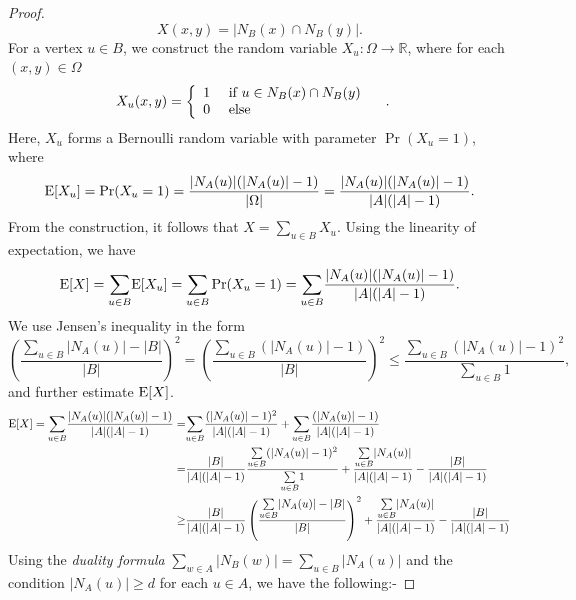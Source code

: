\documentclass[reqno,10pt]{amsart}
\theoremstyle{definition}
\newcommand{\Ex}{\ensuremath{{\textnormal{E}}}}
\begin{document}
\begin{proof}
 \begin{equation*}
X(x,y)=|N_{B}(x)\cap N_{B}(y)|.
\end{equation*}
For a vertex $u\in B$, we construct the random variable $X_{u}:\Omega\rightarrow \mathbb{R}$, where for each $(x,y)\in\Omega$ 
\begin{align*}
X_{u}(x,y)&=\left\{\begin{array}{lll}
			1& \textnormal{ if  }  u\in N_{B}(x)\cap N_{B}(y)\\
			0& \textnormal{ else }&  
		\end{array}\right..
\end{align*}
Here, $X_{u}$ forms a Bernoulli random variable with parameter $\Pr(X_{u}=1)$, where 
\begin{equation*}
\Ex[X_{u}]= \Pr(X_{u}=1)= \frac{|N_{A}(u)|(|N_{A}(u)|-1)}{|\Omega|}=\frac{|N_{A}(u)|(|N_{A}(u)|-1)}{|A|(|A|-1)}. 
\end{equation*}
From the construction, it follows that $X=\underset{u\in B}{\sum}X_{u}$. Using the linearity of expectation, we have 
\begin{equation*}
\Ex[X]=\underset{u\in B}{\sum}\Ex[X_{u}]=\underset{u\in B}{\sum}\Pr (X_{u}=1)=\underset{u\in B}{\sum} \frac{|N_{A}(u)|(|N_{A}(u)|-1)}{|A|(|A|-1)}.   
\end{equation*}
We use Jensen's inequality in the form 
\begin{equation*}
\left(\frac{\underset{u\in B}{\sum}|N_{A}(u)|-|B|}{|B|}\right)^{2}=\left(\frac{\underset{u\in B}{\sum}(|N_{A}(u)|-1)}{|B|}\right)^{2}\leq \frac{\underset{u\in B}{\sum}(|N_{A}(u)|-1)^{2}}{\underset{u\in B}{\sum}1},   
\end{equation*}
and further estimate $\Ex[X]$.  
\begin{align*}
\Ex[X]=\underset{u\in B}{\sum} \frac{|N_{A}(u)|(|N_{A}(u)|-1)}{|A|(|A|-1)}
=&\underset{u\in B}{\sum}\frac{(|N_{A}(u)|-1)^{2}}{|A|(|A|-1)}+ \underset{u\in B}{\sum}\frac{(|N_{A}(u)|-1)}{|A|(|A|-1)}\\
         = &\frac{|B|}{|A|(|A|-1)} \frac{\underset{u\in B}{\sum}(|N_{A}(u)|-1)^{2}}{\underset{u\in B}{\sum}1}+ \frac{\underset{u\in B}{\sum}|N_{A}(u)|}{|A|(|A|-1)}-\frac{|B|}{|A|(|A|-1)}\\
         \geq  &\frac{|B|}{|A|(|A|-1)} \left(\frac{\underset{u\in B}{\sum}|N_{A}(u)|-|B|}{|B|}\right)^{2}+\frac{\underset{u\in B}{\sum}|N_{A}(u)|}{|A|(|A|-1)}-\frac{|B|}{|A|(|A|-1)}\\
\end{align*}
Using the \emph{duality formula} $\underset{w\in A}{\sum}|N_{B}(w)|=\underset{u\in B}{\sum}|N_{A}(u)|$ and the condition $|N_{A}(u)|\geq d$ for each $u\in A$, we have the following:-

\end{proof}
\end{document}
